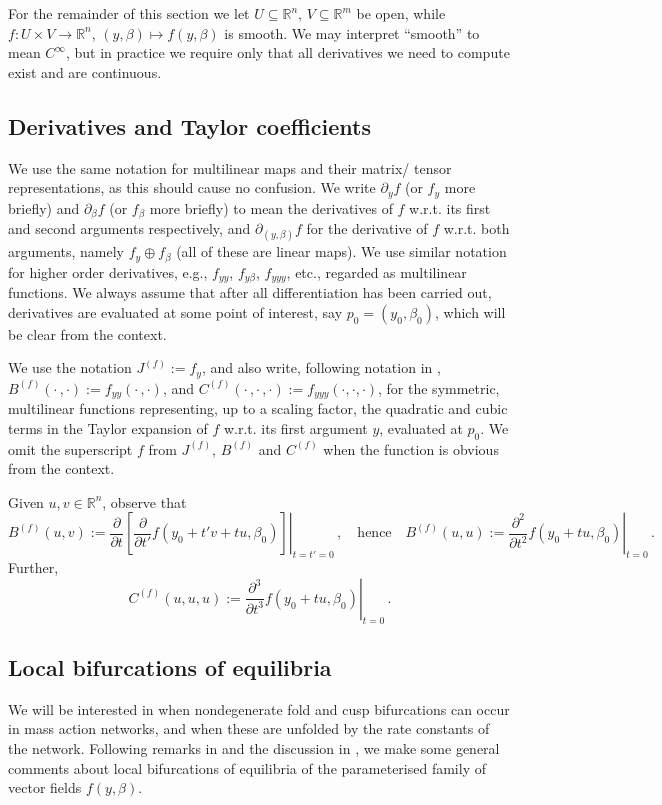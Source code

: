 \documentclass[11pt]{amsart}
\newcommand{\R}{\mathbb{R}}
\theoremstyle{definition}
\begin{document}
For the remainder of this section we let $U \subseteq \R^n,\,V \subseteq \R^m$ be open, while $f\colon U \times V \to \R^n$, $(y,\beta) \mapsto f(y,\beta)$ is smooth. We may interpret ``smooth'' to mean $C^\infty$, but in practice we require only that all derivatives we need to compute exist and are continuous. 

\subsection{Derivatives and Taylor coefficients}
We use the same notation for multilinear maps and their matrix/ tensor representations, as this should cause no confusion. We write $\partial_yf$ (or $f_y$ more briefly) and $\partial_\beta f$ (or $f_\beta$ more briefly) to mean the derivatives of $f$ w.r.t. its first and second arguments respectively, and $\partial_{(y, \beta)} f$ for the derivative of $f$ w.r.t. both arguments, namely $f_y \oplus f_\beta$ (all of these are linear maps). We use similar notation for higher order derivatives, e.g., $f_{yy}$, $f_{y\beta}$, $f_{yyy}$, etc., regarded as multilinear functions. We always assume that after all differentiation has been carried out, derivatives are evaluated at some point of interest, say $p_0=(y_0, \beta_0)$, which will be clear from the context. 

We use the notation $J^{(f)}:=f_y$, and also write, following notation in \cite{kuznetsov:2023}, $B^{(f)}(\cdot\,,\cdot):= f_{yy}(\cdot\,,\cdot)$, and $C^{(f)}(\cdot\,, \cdot\,, \cdot):= f_{yyy}(\cdot, \cdot, \cdot)$, for the symmetric, multilinear functions representing, up to a scaling factor, the quadratic and cubic terms in the Taylor expansion of $f$ w.r.t. its first argument $y$, evaluated at $p_0$. We omit the superscript $f$ from $J^{(f)}$, $B^{(f)}$ and $C^{(f)}$ when the function is obvious from the context.

Given $u,v\in \R^n$, observe that
\[
B^{(f)}(u,v) := \left.\frac{\partial}{\partial t}\left[\frac{\partial}{\partial t'} f(y_0 + t'v + tu,\beta_0)\right]\right|_{t=t'=0}\,, \quad \mbox{hence} \quad B^{(f)}(u,u):=\left.\frac{\partial^2}{\partial t^2}f(y_0 + tu, \beta_0)\right|_{t=0}\,.
\]
Further,
\[
C^{(f)}(u,u,u) := \left.\frac{\partial^3}{\partial t^3}f(y_0 + tu, \beta_0)\right|_{t=0}\,.
\]

\subsection{Local bifurcations of equilibria}
We will be interested in when nondegenerate fold and cusp bifurcations can occur in mass action networks, and when these are unfolded by the rate constants of the network. Following remarks in \cite[Chapter 2]{kuznetsov:2023} and the discussion in \cite[Section 2]{banaji:boros:hofbauer:2025}, we make some general comments about local bifurcations of equilibria of the parameterised family of vector fields $f(y, \beta)$. 
\end{document}
